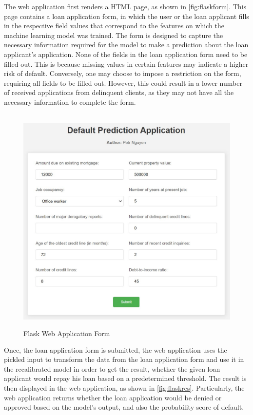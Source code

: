 The web application first renders a HTML page, as shown in \autoref{fig:flaskform}.
This page contains a loan application form, in which the user or the loan applicant fills in the respective field values that correspond to the features on which the machine learning model was trained.
The form is designed to capture the necessary information required for the model to make a prediction about the loan applicant's application.
None of the fields in the loan application form need to be filled out. This is because missing values in certain features may indicate a higher risk of default. Conversely, one may choose to impose a restriction on the form, requiring all fields to be filled out. However, this could result in a lower number of received applications from delinquent clients, as they may not have all the necessary information to complete the form.
\begin{figure}[H]
\centering
\caption{Flask Web Application Form}\vspace{0.5em}
\label{fig:flaskform}\
\includegraphics[width=140mm]{Figures/flask_app_form.jpg}

\vspace{-1em}
\end{figure}


Once, the loan application form is submitted, the web application uses the pickled input to transform the data from the loan application form and use it in the recalibrated model in order to get the result, whether the given loan applicant would repay his loan based on a predetermined threshold. The result is then displayed in the web application, as shown in \autoref{fig:flaskres}.
Particularly, the web application returns whether the loan application would be denied or approved based on the model's output, and also the probability score of default.


